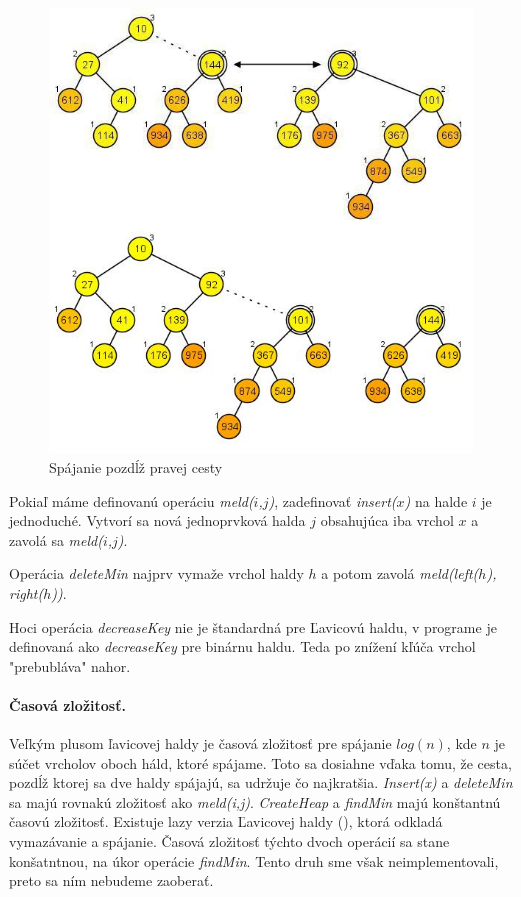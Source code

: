 \begin{figure}
\includegraphics[width=\columnwidth]{obrazky/leftistmeld.png}
\caption{\emph{} 
Spájanie pozdĺž pravej cesty} 
\label{img:leftmeld} 
\end{figure}

Pokiaľ máme definovanú operáciu \emph{meld($i$,$j$)}, zadefinovať \emph{insert($x$)} na halde $i$ je jednoduché. Vytvorí sa nová jednoprvková halda $j$ obsahujúca iba vrchol $x$ a zavolá sa \emph{meld($i$,$j$)}.

Operácia \emph{deleteMin} najprv vymaže vrchol haldy $h$ a potom zavolá \emph{meld(left($h$), right($h$))}.

Hoci operácia \emph{decreaseKey} nie je štandardná pre Ľavicovú haldu, v programe je definovaná ako \emph{decreaseKey} pre 
binárnu haldu. Teda po znížení kľúča vrchol "prebubláva" nahor.

\paragraph{Časová zložitosť.}
Veľkým plusom ľavicovej haldy je časová zložitosť pre spájanie $log(n)$, kde $n$ je súčet vrcholov oboch háld, 
ktoré spájame. Toto sa dosiahne vďaka tomu, že cesta, pozdĺž ktorej sa dve haldy spájajú, sa udržuje čo 
najkratšia. \emph{Insert(x)} a \emph{deleteMin} sa majú rovnakú zložitosť ako \emph{meld(i,j)}. \emph{CreateHeap} a \emph{findMin} majú konštantnú časovú zložitosť.
Existuje lazy verzia Ľavicovej haldy (\cite{left}), ktorá odkladá vymazávanie a spájanie. Časová zložitosť týchto dvoch 
operácií sa stane konšatntnou, na úkor operácie \emph{findMin}. Tento druh sme však neimplementovali, preto sa ním 
nebudeme zaoberať.